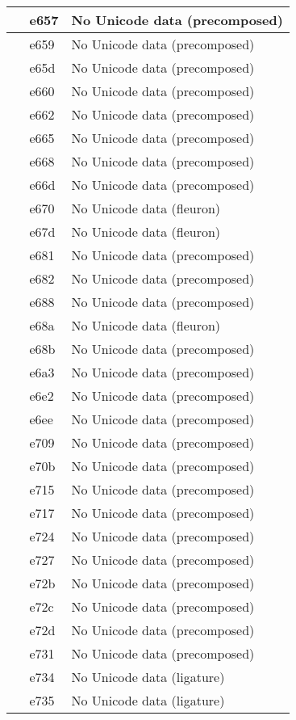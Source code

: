 \documentclass[12pt,letterpaper,openany]{book}
\begin{document}
\begin{center}
\begin{supertabular}{|m{0.25in}|m{0.5in}|m{4in}|}
 & e657 & No Unicode data (precomposed)\\\hline
 & e659 & No Unicode data (precomposed)\\\hline
 & e65d & No Unicode data (precomposed)\\\hline
 & e660 & No Unicode data (precomposed)\\\hline
 & e662 & No Unicode data (precomposed)\\\hline
 & e665 & No Unicode data (precomposed)\\\hline
 & e668 & No Unicode data (precomposed)\\\hline
 & e66d & No Unicode data (precomposed)\\\hline
 & e670 & No Unicode data (fleuron)\\\hline
 & e67d & No Unicode data (fleuron)\\\hline
 & e681 & No Unicode data (precomposed)\\\hline
 & e682 & No Unicode data (precomposed)\\\hline
 & e688 & No Unicode data (precomposed)\\\hline
 & e68a & No Unicode data (fleuron)\\\hline
 & e68b & No Unicode data (precomposed)\\\hline
 & e6a3 & No Unicode data (precomposed)\\\hline
 & e6e2 & No Unicode data (precomposed)\\\hline
 & e6ee & No Unicode data (precomposed)\\\hline
 & e709 & No Unicode data (precomposed)\\\hline
 & e70b & No Unicode data (precomposed)\\\hline
 & e715 & No Unicode data (precomposed)\\\hline
 & e717 & No Unicode data (precomposed)\\\hline
 & e724 & No Unicode data (precomposed)\\\hline
 & e727 & No Unicode data (precomposed)\\\hline
 & e72b & No Unicode data (precomposed)\\\hline
 & e72c & No Unicode data (precomposed)\\\hline
 & e72d & No Unicode data (precomposed)\\\hline
 & e731 & No Unicode data (precomposed)\\\hline
 & e734 & No Unicode data (ligature)\\\hline
 & e735 & No Unicode data (ligature)\\\hline

\end{supertabular}
\end{center}
\end{document}
